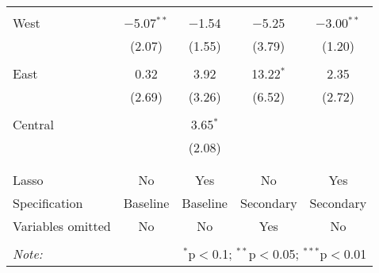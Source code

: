 \begin{table}[!htbp]
\begin{tabular}{@{\extracolsep{2pt}}lcccc}
  & & & & \\ 
 West & $-$5.07$^{**}$ & $-$1.54 & $-$5.25 & $-$3.00$^{**}$ \\ 
  & (2.07) & (1.55) & (3.79) & (1.20) \\ 
  & & & & \\ 
 East & 0.32 & 3.92 & 13.22$^{*}$ & 2.35 \\ 
  & (2.69) & (3.26) & (6.52) & (2.72) \\ 
  & & & & \\ 
 Central &  & 3.65$^{*}$ &  &  \\ 
  &  & (2.08) &  &  \\ 
  & & & & \\ 
\hline \\[-1.8ex] 
Lasso & No & Yes & No & Yes \\ 
Specification & Baseline & Baseline & Secondary & Secondary \\ 
Variables omitted & No & No & Yes & No \\ 
\hline 
\hline \\[-1.8ex] 
\textit{Note:}  & \multicolumn{4}{r}{$^{*}$p$<$0.1; $^{**}$p$<$0.05; $^{***}$p$<$0.01} \\ 
\end{tabular} 
\end{table} 
